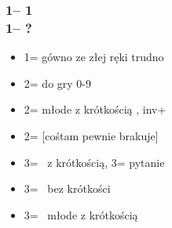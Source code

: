 \documentclass[12pt, a4paper]{article}
\begin{document}
\subsubsection*{1\clubs -- 1\diams \\
                1\spades -- ?}
\begin{itemize}
    \item 1\nt = gówno ze złej ręki trudno 
    \item 2\minor = do gry 0-9 
    \item 2\hearts = młode z krótkością \hearts, inv+ 
    \item 2\nt = [cośtam pewnie brakuje] 
    \item 3\clubs = \gf\ \diams z krótkością, 3\diams = pytanie
    \item 3\diams = \gf\ \diams bez krótkości 
    \item 3\spades = \gf\ młode z krótkością \spades
\end{itemize}
\end{document}
